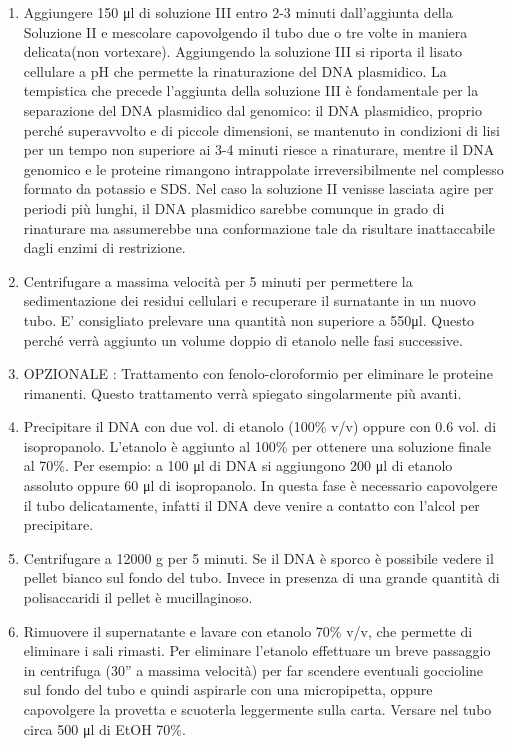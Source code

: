 \begin{enumerate}
  \item Aggiungere 150 μl di soluzione III entro 2-3 minuti dall’aggiunta della Soluzione II e mescolare capovolgendo il tubo due o tre volte in maniera delicata(non vortexare). Aggiungendo la soluzione III si riporta il lisato cellulare a pH che permette la rinaturazione del DNA plasmidico.
La tempistica che precede l’aggiunta della soluzione III è fondamentale per la separazione del DNA plasmidico dal genomico: il DNA plasmidico, proprio perché superavvolto e di piccole dimensioni, se mantenuto in condizioni di lisi per un tempo non superiore ai 3-4 minuti riesce a rinaturare, mentre il DNA genomico e le proteine rimangono intrappolate irreversibilmente nel complesso formato da potassio e SDS. Nel caso la soluzione II venisse lasciata agire per periodi più lunghi, il DNA plasmidico sarebbe comunque in grado di rinaturare ma assumerebbe una conformazione tale da risultare inattaccabile dagli enzimi di restrizione.

  \item Centrifugare a massima velocità per 5 minuti per permettere la sedimentazione dei residui cellulari e recuperare il surnatante in un nuovo tubo. E’ consigliato prelevare una quantità non superiore a 550μl. Questo perché verrà aggiunto un volume doppio di etanolo nelle fasi successive.

  \item OPZIONALE : Trattamento con fenolo-cloroformio per eliminare le proteine rimanenti. Questo trattamento verrà spiegato singolarmente più avanti.

  \item Precipitare il DNA con due vol. di etanolo (100\% v/v) oppure con 0.6 vol. di isopropanolo. L'etanolo è aggiunto al 100\% per ottenere una soluzione finale al 70\%. Per esempio: a 100 μl di DNA si aggiungono 200 μl di etanolo assoluto oppure 60 μl di isopropanolo. In questa fase è necessario capovolgere il tubo delicatamente, infatti il DNA deve venire a contatto con l’alcol per precipitare.

  \item Centrifugare a 12000 g per 5 minuti. Se il DNA è sporco è possibile vedere il pellet bianco sul fondo del tubo. Invece in presenza di una grande quantità di polisaccaridi il pellet è mucillaginoso.

  \item Rimuovere il supernatante e lavare con etanolo 70\% v/v, che permette di eliminare i sali rimasti. Per eliminare l’etanolo effettuare un breve passaggio in centrifuga (30” a massima velocità) per far scendere eventuali goccioline sul fondo del tubo e quindi aspirarle con una micropipetta, oppure capovolgere la provetta e scuoterla leggermente sulla carta. Versare nel tubo circa 500 μl di EtOH 70\%.


\end{enumerate}
